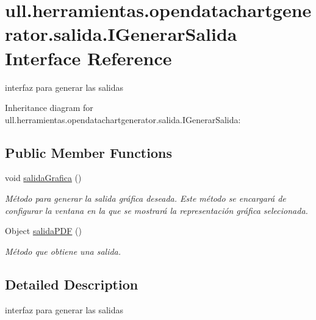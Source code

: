 \hypertarget{interfaceull_1_1herramientas_1_1opendatachartgenerator_1_1salida_1_1_i_generar_salida}{}\section{ull.\+herramientas.\+opendatachartgenerator.\+salida.\+I\+Generar\+Salida Interface Reference}
\label{interfaceull_1_1herramientas_1_1opendatachartgenerator_1_1salida_1_1_i_generar_salida}


interfaz para generar las salidas  




Inheritance diagram for ull.\+herramientas.\+opendatachartgenerator.\+salida.\+I\+Generar\+Salida\+:
\subsection*{Public Member Functions}
\begin{DoxyCompactItemize}
\item 
\mbox{\label{interfaceull_1_1herramientas_1_1opendatachartgenerator_1_1salida_1_1_i_generar_salida_a535f03f3233e1d89910fedb604534ba9}} 
void \mbox{\hyperlink{interfaceull_1_1herramientas_1_1opendatachartgenerator_1_1salida_1_1_i_generar_salida_a535f03f3233e1d89910fedb604534ba9}{salida\+Grafica}} ()
\begin{DoxyCompactList}\small\item\em Método para generar la salida gráfica deseada. Este método se encargará de configurar la ventana en la que se mostrará la representación gráfica selecionada. \end{DoxyCompactList}\item 
Object \mbox{\hyperlink{interfaceull_1_1herramientas_1_1opendatachartgenerator_1_1salida_1_1_i_generar_salida_ac79d306ba661c9ee5375874289a3aa26}{salida\+P\+DF}} ()
\begin{DoxyCompactList}\small\item\em Método que obtiene una salida. \end{DoxyCompactList}\end{DoxyCompactItemize}


\subsection{Detailed Description}
interfaz para generar las salidas 

